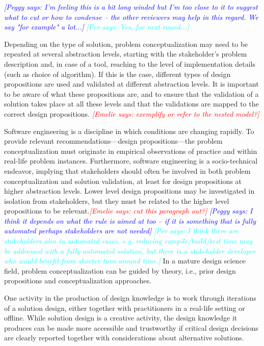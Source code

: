 \documentclass[graybox]{svmult}
\newcommand{\emelie}[1]{\textcolor{red}{{\it [Emelie says: #1]}}}
\newcommand{\peggy}[1]{\textcolor{blue}{{\it [Peggy says: #1]}}}
\newcommand{\per}[1]{\textcolor{cyan}{{\it [Per says: #1]}}}
\newcommand{\emelie}[1]{}
\newcommand{\peggy}[1]{}
\newcommand{\per}[1]{}
\begin{document}
\peggy{I'm feeling this is a bit long winded but I'm too close to it to suggest what to cut or how to condense -- the other reviewers may help in this regard.  We say "for example" a lot...} \per{Yes, for next round...}


Depending on the type of solution, problem conceptualization may need to be repeated at several abstraction levels, starting with the stakeholder's problem description and, in case of a tool, reaching to the level of implementation details (such as choice of algorithm). If this is the case, different types of design propositions are used and validated at different abstraction levels. It is important to be aware of what these propositions are, and to ensure that the validation of a solution takes place at all these levels and that the validations are mapped to the correct design propositions. \emelie{exemplify or refer to the nested model?} 

Software engineering is a discipline in which conditions are changing rapidly. To provide relevant recommendations---design propositions---the problem conceptualization must originate in empirical observations of practice and within real-life problem instances. Furthermore, software engineering is a socio-technical endeavor, implying that stakeholders should often be involved in both problem conceptualization and solution validation, at least for design propositions at higher abstraction levels. Lower level design propositions may be investigated in isolation from stakeholders, but they must be related to the higher level propositions to be relevant.\emelie{cut this paragraph out?} 
\peggy{I think it depends on what the rule is aimed at too -- if it is something that is fully automated perhaps stakeholders are not needed} \per{I think there are stakeholders also in automated cases, e.g. reducing compile/build/test time may be addressed with a fully automated solution, but there is a stakeholder developer who would benefit from shorter turn around time.}
In a mature design science field, problem conceptualization can be guided by theory, i.e., prior design propositions and conceptualization approaches. 


One activity in the production of design knowledge is to work through iterations of a solution design, either together with practitioners in a real-life setting or offline. 
While solution design is a creative activity, the design knowledge it produces can be made more accessible and trustworthy if critical design decisions are clearly reported together with considerations about alternative solutions.
\end{document}
